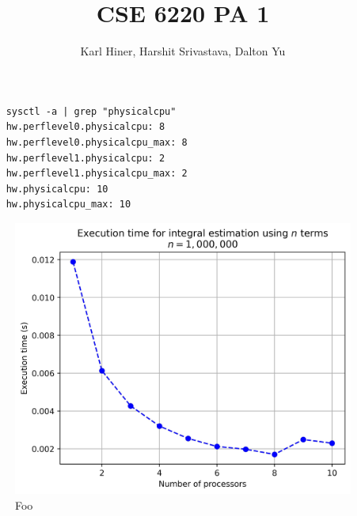 \documentclass[twoside,10pt]{article}
\begin{document}
\title{CSE 6220 PA 1}
\author{Karl Hiner, Harshit Srivastava, Dalton Yu}
\date{}
\maketitle

\section{}


\begin{verbatim}
    sysctl -a | grep "physicalcpu"
    hw.perflevel0.physicalcpu: 8
    hw.perflevel0.physicalcpu_max: 8
    hw.perflevel1.physicalcpu: 2
    hw.perflevel1.physicalcpu_max: 2
    hw.physicalcpu: 10
    hw.physicalcpu_max: 10
\end{verbatim}

\begin{figure}[htb]
    \begin{center}
        \includegraphics[width=150mm]{report_chart_n_1M.jpg}
    \end{center}
    \caption{Foo}
    \label{fig:figure1}
\end{figure}
  
\end{document}
